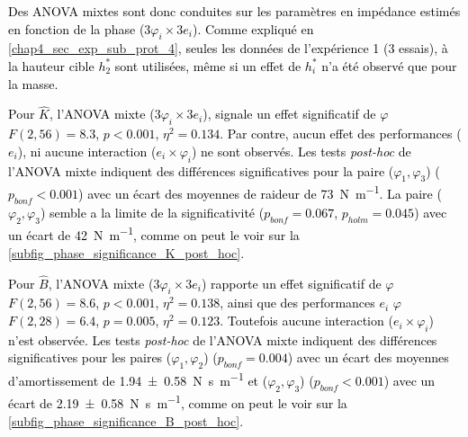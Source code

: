 \textcolor{black}{Des ANOVA mixtes sont donc conduites sur les paramètres en impédance estimés en fonction de la phase ($3 \varphi_i \times 3 e_i$). Comme expliqué en \cref{chap4_sec_exp_sub_prot_4}, seules les données de l'expérience 1 (3 essais), à la hauteur cible $h^*_2$ sont utilisées, même si un effet de $h^*_i$ n'a été observé que pour la masse. }%

\textcolor{black}{Pour $\hat{K}$, l'ANOVA mixte ($3 \varphi_i \times 3 e_i$), signale un effet significatif de $\varphi$ $F(2, 56) = 8.3$, $p<0.001$,  $\eta^2 = 0.134$. Par contre, aucun effet des performances ($e_i$), ni aucune interaction ($e_i\times\varphi_i$) ne sont observés. %
%
Les tests \textit{post-hoc} de l'ANOVA mixte indiquent des différences significatives pour la paire ($\varphi_1,\varphi_3$) ($p_{bonf}<0.001$) avec un écart des moyennes de raideur de \SI{73}{\newton\per\meter}. La paire ($\varphi_2,\varphi_3$) semble a la limite de la significativité ($p_{bonf}=0.067$, $p_{holm}=0.045$) avec un écart de \SI{42}{\newton\per\meter}, comme on peut le voir sur la \cref{subfig_phase_significance_K_post_hoc}.}

\textcolor{black}{Pour $\hat{B}$, l'ANOVA mixte ($3 \varphi_i \times 3 e_i$) %
rapporte un effet significatif de $\varphi$ $F(2, 56) = 8.6$, $p<0.001$,  $\eta^2 = 0.138$, ainsi que des performances $e_i$ $\varphi$ $F(2, 28) = 6.4$, $p=0.005$,  $\eta^2 = 0.123$. Toutefois  aucune interaction ($e_i\times\varphi_i$) n'est observée. %
%
Les tests \textit{post-hoc} de l'ANOVA mixte indiquent des différences significatives pour les paires ($\varphi_1,\varphi_2$) ($p_{bonf}=0.004$) avec un écart des moyennes d'amortissement de \SI{1.94\pm0.58}{\newton\second\per\meter}%
 et ($\varphi_2,\varphi_3$) ($p_{bonf}<0.001$) avec un écart de \SI{2.19\pm0.58}{\newton\second\per\meter}, comme on peut le voir sur la \cref{subfig_phase_significance_B_post_hoc}.}

